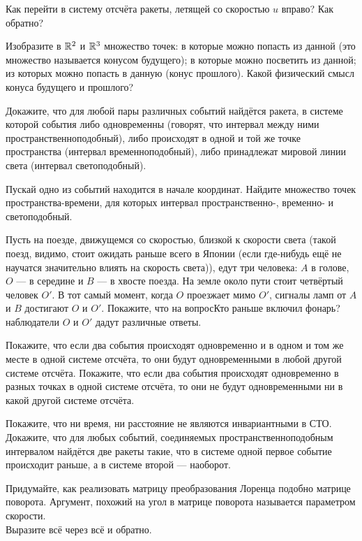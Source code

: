 \documentclass[a4paper,12pt]{article}
\newcommand{\мв}{\,м$_в$}
\begin{document}
Как перейти в систему отсчёта ракеты, летящей со скоростью $u$ вправо? Как обратно?


Изобразите в $\mathbb{R}^2$ и $\mathbb{R}^3$ множество точек:  в которые можно попасть из данной (это множество называется  конусом  будущего);  в которые можно посветить из данной;  из которых можно попасть в данную ( конус  прошлого). Какой физический смысл конуса будущего и прошлого?

Докажите, что для любой пары различных событий найдётся ракета, в системе которой события либо одновременны (говорят, что интервал между ними  пространственноподобный), либо происходят в одной и той же точке пространства (интервал временноподобный), либо принадлежат мировой линии света (интервал  светоподобный).

Пускай одно из событий находится в начале координат. Найдите множество точек пространства-времени, для которых интервал пространственно-, временно- и светоподобный.

Пусть на поезде, движущемся со скоростью, близкой к скорости света (такой поезд, видимо, стоит ожидать раньше всего в Японии (если где-нибудь ещё не научатся значительно влиять на скорость света)), едут три человека: $A$ в голове, $O$ --- в середине и  $B$ --- в хвосте поезда. На земле около пути стоит четвёртый человек $O'$. В тот самый момент, когда $O$ проезжает мимо $O'$, сигналы ламп от $A$ и $B$ достигают $O$ и $O'$.
Покажите, что на вопрос Кто раньше включил фонарь? наблюдатели $O$ и $O'$ дадут различные ответы.

Покажите, что если два события происходят одновременно и в одном и том же месте в одной системе отсчёта, то они будут одновременными в любой другой системе отсчёта.
Покажите, что если два события происходят одновременно в разных точках в одной системе отсчёта, то они не будут одновременными ни в какой другой системе отсчёта.

Покажите, что ни время, ни расстояние не являются инвариантными в СТО.
Докажите, что для любых событий, соединяемых пространственноподобным интервалом найдётся две ракеты такие, что в системе одной первое событие происходит раньше, а в системе второй --- наоборот.

Придумайте, как реализовать матрицу преобразования Лоренца подобно матрице поворота. Аргумент, похожий на угол в матрице поворота называется  параметром  скорости.\\
Выразите всё через всё и обратно.
\end{document}
